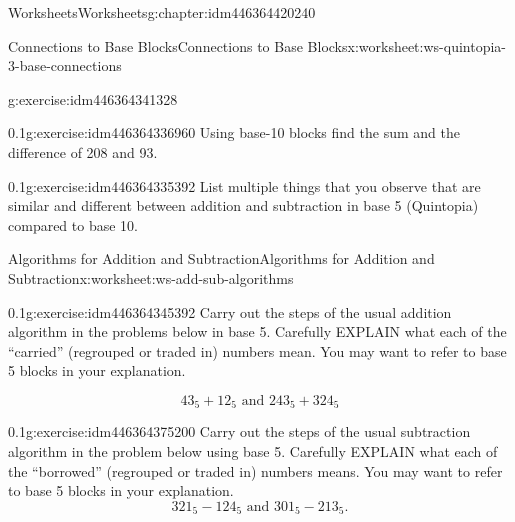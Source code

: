 \documentclass[twoside,11pt,]{book}
\begin{document}
\begin{chapterptx}{Worksheets}{}{Worksheets}{}{}{g:chapter:idm446364420240}
\begin{worksheet-section-numberless}{Connections to Base Blocks}{}{Connections to Base Blocks}{}{}{x:worksheet:ws-quintopia-3-base-connections}
\begin{divisionexercise}{3}{}{}{g:exercise:idm446364341328}
\begin{enumerate}[label=(\alph*)]
\end{enumerate}
\end{divisionexercise}%
\begin{divisionexercise}{4}{}{0.1}{g:exercise:idm446364336960}%
Using base-10 blocks find the sum and the difference of 208 and 93.%
\end{divisionexercise}%
\begin{divisionexercise}{5}{}{0.1}{g:exercise:idm446364335392}%
List multiple things that you observe that are similar and different between addition and subtraction in base 5 (Quintopia) compared to base 10.%
\end{divisionexercise}%
\end{worksheet-section-numberless}
\restoregeometry
%
%
\typeout{************************************************}
\typeout{************************************************}
%
\begin{worksheet-section-numberless}{Algorithms for Addition and Subtraction}{}{Algorithms for Addition and Subtraction}{}{}{x:worksheet:ws-add-sub-algorithms}
\begin{divisionexercise}{1}{}{0.1}{g:exercise:idm446364345392}%
Carry out the steps of the usual addition algorithm in the problems below in base 5.  Carefully EXPLAIN what each of the ``carried'' (regrouped or traded in) numbers mean.  You may want to refer to base 5 blocks in your explanation.%
\par
%
\begin{equation*}
43_{5}+12_{5} \text{ and } 243_{5}+324_{5}
\end{equation*}
%
\end{divisionexercise}%
\clearpage
\begin{divisionexercise}{2}{}{0.1}{g:exercise:idm446364375200}%
Carry out the steps of the usual subtraction algorithm in the problem below using base 5.  Carefully EXPLAIN what each of the ``borrowed'' (regrouped or traded in) numbers means.  You may want to refer to base 5 blocks in your explanation.%
\begin{equation*}
321_{5}-124_5 \text{ and } 301_5-213_5 \text{.}
\end{equation*}
%
\end{divisionexercise}%
\end{worksheet-section-numberless}
\restoregeometry
%
%
\typeout{************************************************}

\end{chapterptx}
\end{document}

